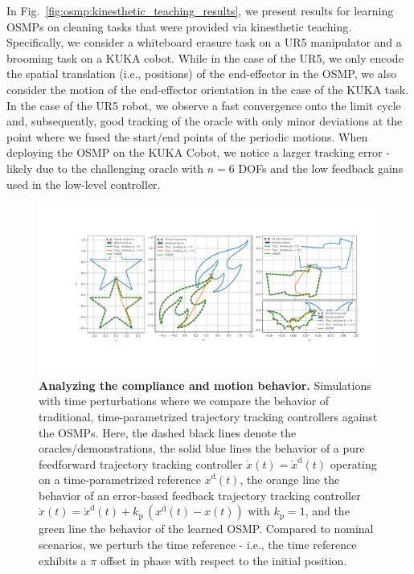 In Fig.~\ref{fig:osmp:kinesthetic_teaching_results}, we present results for learning \glspl{OSMP} on cleaning tasks that were provided via kinesthetic teaching. Specifically, we consider a whiteboard erasure task on a UR5 manipulator and a brooming task on a KUKA cobot.
While in the case of the UR5, we only encode the spatial translation (i.e., positions) of the end-effector in the \gls{OSMP}, we also consider the motion of the end-effector orientation in the case of the KUKA task. 
In the case of the UR5 robot, we observe a fast convergence onto the limit cycle and, subsequently, good tracking of the oracle with only minor deviations at the point where we fused the start/end points of the periodic motions.
When deploying the \gls{OSMP} on the KUKA \gls{Cobot}, we notice a larger tracking error - likely due to the challenging oracle with $n=6$ \glspl{DOF} and the low feedback gains used in the low-level controller.


\begin{figure}[h]
    \centering
    \includegraphics[width=1.0\linewidth]{osmp/figures/compliance_results/compliance_results_v1_cropped.pdf}
    \caption{\textbf{Analyzing the compliance and motion behavior.}
    Simulations with time perturbations where we compare the behavior of traditional, time-parametrized trajectory tracking controllers against the \glspl{OSMP}. Here, the dashed black lines denote the oracles/demonstrations, the solid blue lines the behavior of a pure feedforward trajectory tracking controller $\dot{x}(t) = \dot{x}^\mathrm{d}(t)$ operating on a time-parametrized reference $\dot{x}^\mathrm{d}(t)$, the orange line the behavior of an error-based feedback trajectory tracking controller $\dot{x}(t) = \dot{x}^\mathrm{d}(t) + k_\mathrm{p} \, (x^\mathrm{d}(t) - x(t))$ with $k_\mathrm{p} = 1$, and the green line the behavior of the learned \gls{OSMP}. Compared to nominal scenarios, we perturb the time reference - i.e., the time reference exhibits a $\pi$ offset in phase with respect to the initial position.
    }
    \label{fig:osmp:compliance_results}
\end{figure}

